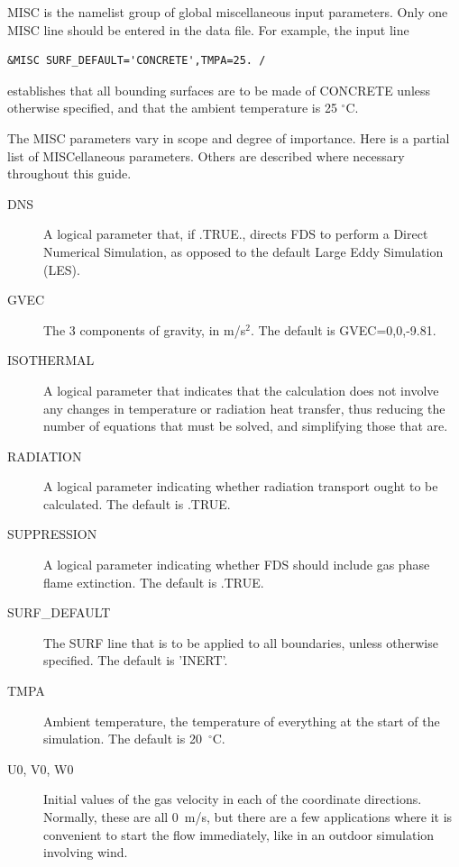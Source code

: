 \documentclass[11pt]{book}
\begin{document}
{\ct MISC} is the namelist group of global miscellaneous input parameters.
Only one {\ct MISC} line should be entered in the data file. For example, the input line

\footnotesize
\begin{verbatim}
&MISC SURF_DEFAULT='CONCRETE',TMPA=25. /
\end{verbatim}
\normalsize

\noindent
establishes that all bounding surfaces are to be made of {\ct CONCRETE} unless
otherwise specified, and that
the ambient temperature is 25 $^\circ$C.

The {\ct MISC} parameters vary in scope and degree of importance. Here is a partial list of {\ct MISC}ellaneous parameters. Others are described where necessary throughout this
guide.

\begin{description}
\item[{\ct DNS}] A logical parameter that, if {\ct .TRUE.}, directs FDS to perform a Direct Numerical Simulation, as opposed to the default Large Eddy Simulation (LES).
\item[{\ct GVEC}] The 3 components of gravity, in m/s$^2$. The default is {\ct GVEC=0,0,-9.81}.
\item[{\ct ISOTHERMAL}] A logical parameter that indicates that the calculation does not involve any changes in temperature or
radiation heat transfer, thus reducing the number of equations that must be solved, and simplifying those that are.
\item[{\ct RADIATION}] A logical parameter indicating whether radiation transport ought to be calculated. The default is {\ct .TRUE.}
\item[{\ct SUPPRESSION}] A logical parameter indicating whether FDS should include gas phase flame extinction. The default is {\ct .TRUE.}
\item[{\ct SURF\_DEFAULT}] The {\ct SURF} line that is to be applied to all boundaries, unless otherwise specified. The default is {\ct 'INERT'}.
\item[{\ct TMPA}] Ambient temperature, the temperature of everything at the start of the simulation. The default is 20~$^\circ$C.
\item[{\ct U0, V0, W0}] Initial values of the gas velocity in each of the coordinate directions. Normally, these are all 0~m/s, but there are a few applications where it is
convenient to start the flow immediately, like in an outdoor simulation involving wind.
\end{description}
\end{document}
